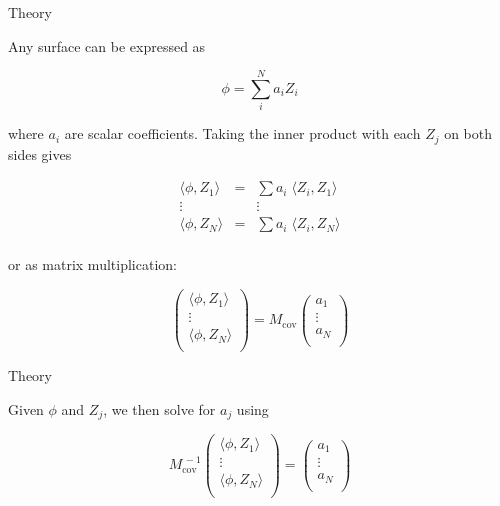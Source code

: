 \documentclass[xetex,10pt]{beamer}
\def\spacer{\vspace*{1em}}
\begin{document}
\begin{frame}[fragile]{Theory}
	
	Any surface can be expressed as 
	
	\[
	\phi = \sum_i^N a_i Z_i
	\]
	
	where $a_i$ are scalar coefficients. \pause Taking the inner product with each $Z_j$ on both sides gives
	
	\[
	\begin{array}{ccc}
	\langle \phi,Z_1 \rangle &=& \sum a_i \; \langle Z_i, Z_1 \rangle\\
	\vdots &  & \vdots \\
	\langle \phi,Z_N \rangle &=& \sum a_i \; \langle Z_i, Z_N \rangle\\
  	\end{array}
	\]
	
	\pause
	or as matrix multiplication:
	
	\[
	 \begin{pmatrix}
	 \langle \phi,Z_1 \rangle \\
	 \vdots \\
	 \langle \phi,Z_N \rangle \\
	 \end{pmatrix}
	 = M_{\mathrm{cov}} 
	 \begin{pmatrix}
	 a_1 \\
	 \vdots \\
	 a_N \\
	 \end{pmatrix}
	\]

\end{frame}

\begin{frame}[fragile]{Theory}
	
	Given $\phi$ and $Z_j$, we then solve for $a_j$ using
	
	\spacer

	\[
	 M_{\mathrm{cov}}^{\,-1} 
	 \begin{pmatrix}
	 \langle \phi,Z_1 \rangle \\
	 \vdots \\
	 \langle \phi,Z_N \rangle \\
	 \end{pmatrix}
	 =
	 \begin{pmatrix}
	 a_1 \\
	 \vdots \\
	 a_N \\
	 \end{pmatrix}
	\]

\end{frame}
\end{document}
